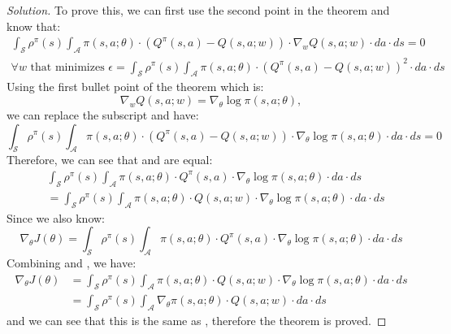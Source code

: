 \documentclass[12pt]{article}
\newenvironment{solution}
  {\renewcommand\qedsymbol{$\blacksquare$}\begin{proof}[Solution]}
  {\end{proof}}
\begin{document}
\begin{solution}
	To prove this, we can first use the second point in the theorem and know that:
	\begin{equation}\label{eq:w_transform_1}
	\begin{aligned}
	\int_{\mathcal{S}} \rho^{\pi}(s) \int_{\mathcal{A}} \pi(s, a ; \theta) \cdot\left(Q^{\pi}(s, a)-Q(s, a ; w)\right) \cdot \nabla_{w} Q(s, a ; w) \cdot d a \cdot d s=0 \\
	\forall w \text{ that minimizes } \epsilon=\int_{\mathcal{S}} \rho^{\pi}(s) \int_{\mathcal{A}} \pi(s, a ; \theta) \cdot\left(Q^{\pi}(s, a)-Q(s, a ; w)\right)^{2} \cdot d a \cdot d s
	\end{aligned}
	\end{equation}
	Using the first bullet point of the theorem which is:
	\begin{equation}
	\nabla_{w} Q(s, a ; w)=\nabla_{\theta} \log \pi(s, a ; \theta),
	\end{equation}
	we can replace the subscript and have:
	\begin{equation}\label{eq:w_transform_2}
		\int_{\mathcal{S}} \rho^{\pi}(s) \int_{\mathcal{A}} \pi(s, a ; \theta) \cdot\left(Q^{\pi}(s, a)-Q(s, a ; w)\right) \cdot \nabla_{\theta} \log \pi(s, a ; \theta) \cdot d a \cdot d s=0
	\end{equation}
	Therefore, we can see that  and  are equal:
	\begin{equation}\label{eq:w_equals}
		\begin{aligned}
		&\int_{\mathcal{S}} \rho^{\pi}(s) \int_{\mathcal{A}} \pi(s, a ; \theta) \cdot Q^{\pi}(s, a) \cdot \nabla_{\theta} \log \pi(s, a ; \theta) \cdot d a \cdot d s \\
		&= \int_{\mathcal{S}} \rho^{\pi}(s) \int_{\mathcal{A}} \pi(s, a ; \theta) \cdot Q(s, a ; w) \cdot \nabla_{\theta} \log \pi(s, a ; \theta) \cdot d a \cdot d s
		\end{aligned}
	\end{equation}	
	Since we also know:
	\begin{equation}\label{eq:w_gradient}
		\nabla_{\theta} J(\theta) =\int_{\mathcal{S}} \rho^{\pi}(s) \int_{\mathcal{A}} \pi(s, a ; \theta) \cdot Q^{\pi}(s, a) \cdot \nabla_{\theta} \log \pi(s, a ; \theta) \cdot d a \cdot d s
	\end{equation}
	Combining  and , we have:
	\begin{equation}
	\begin{aligned}
	\nabla_{\theta} J(\theta)
	&=\int_{\mathcal{S}} \rho^{\pi}(s) \int_{\mathcal{A}} \pi(s, a ; \theta) \cdot Q(s, a ; w) \cdot \nabla_{\theta} \log \pi(s, a ; \theta) \cdot d a \cdot d s \\ 
	&=\int_{\mathcal{S}} \rho^{\pi}(s) \int_{\mathcal{A}} \nabla_{\theta} \pi(s, a ; \theta) \cdot Q(s, a ; w) \cdot d a \cdot d s
	\end{aligned}
	\end{equation}
	and we can see that this is the same as , therefore the theorem is proved.	
\end{solution}
\end{document}
